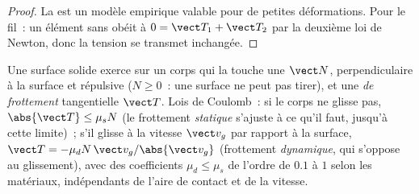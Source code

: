 \begin{proof}
La  est un modèle empirique valable pour de petites
déformations. Pour le fil~: un élément sans  obéit à
$0 = \vect T_1 + \vect T_2$ par la deuxième loi de Newton, donc la
tension se transmet inchangée.
\end{proof}

\begin{proposition}\label{prop:b1:newton-dynamics:friction}
Une surface solide exerce sur un corps qui la touche une \emph{} $\vect N$, perpendiculaire à la surface et répulsive
($N \geq 0$~: une surface ne peut pas tirer), et une \emph{ de
frottement} tangentielle $\vect T$. Lois de Coulomb~: si le corps ne
glisse pas, $\abs{\vect T} \leq \mu_s N$ (le frottement \emph{statique}
s'ajuste à ce qu'il faut, jusqu'à cette limite)~; s'il glisse à la
vitesse $\vect v_g$ par rapport à la surface,
$\vect T = -\mu_d N\,\vect v_g/\abs{\vect v_g}$ (frottement
\emph{dynamique}, qui s'oppose au glissement), avec des coefficients
$\mu_d \leq \mu_s$ de l'ordre de $0.1$ à $1$ selon les matériaux,
indépendants de l'aire de contact et de la vitesse.
\end{proposition}
\admitted

